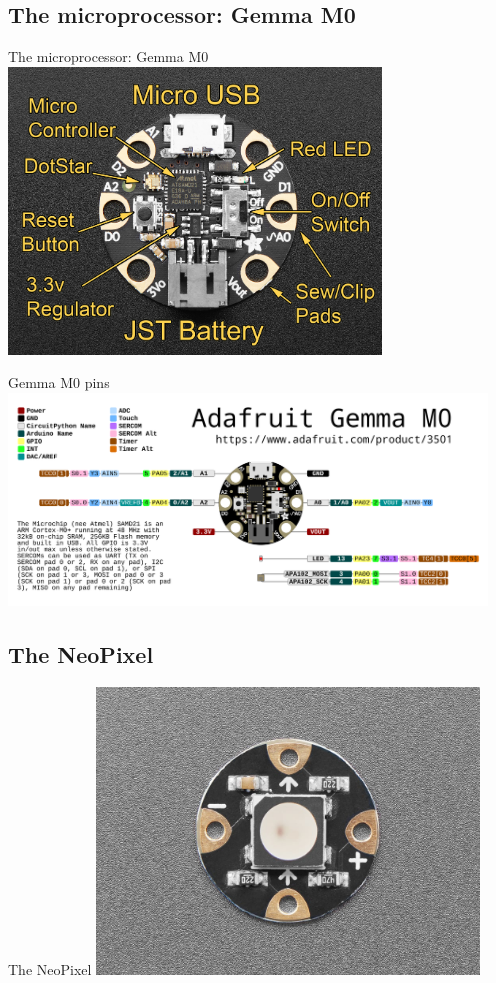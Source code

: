 \documentclass{beamer}
\begin{document}
\subsection{The microprocessor: Gemma M0}
\begin{frame}[fragile]{The microprocessor: Gemma M0}
\includegraphics[height=3in]{gemma_guide.jpg}
\end{frame}
\begin{frame}[fragile]{Gemma M0 pins}
\includegraphics[width=5in]{adafruit_gemma_Adafruit_GEMMA_M0_pinout.png}
\end{frame}
\subsection{The NeoPixel}
\begin{frame}[fragile]{The NeoPixel}
\includegraphics[height=3in]{FloraNeoPixel.jpg}
\end{frame}
\end{document}

